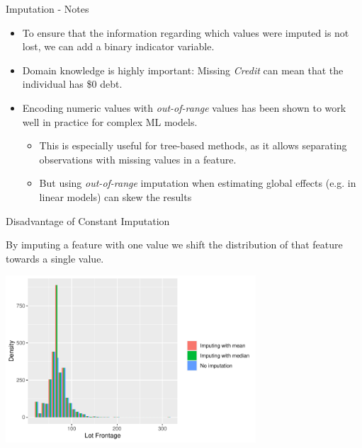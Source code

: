 \documentclass[11pt,compress,t,notes=noshow, xcolor=table]{beamer}
\begin{document}
\begin{frame}{Imputation - Notes}

    \begin{itemize}
        \item To ensure that the information regarding which values were imputed is not lost, we can add a binary indicator variable.
        
        \item Domain knowledge is highly important: Missing \textit{Credit} can mean that the individual has \$0 debt.
        
        \item Encoding numeric values with \textit{out-of-range} values has been shown to work well in practice for complex ML models.
        \begin{itemize}
            \item This is especially useful for tree-based methods, as it allows separating observations with missing values in a feature.
            \item But using \textit{out-of-range} imputation when estimating global effects (e.g. in linear models) can skew the results
        \end{itemize}
    \end{itemize}

\end{frame}

\begin{frame}{Disadvantage of Constant Imputation}

    By imputing a feature with one value we shift the distribution of that feature towards a single value.
    
    \begin{center}
        \includegraphics[width=0.7\textwidth]{figure/imputation_distribution_comparison}
    \end{center}

\end{frame}
\end{document}
